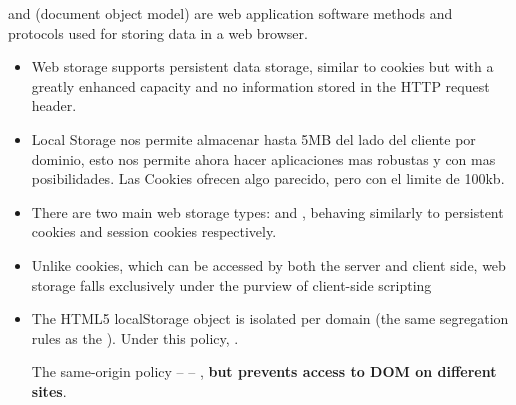 
 and  
(document object model) are web application
software methods and protocols used for storing data in a web browser. 

\begin{itemize}
\item
Web storage supports persistent data storage, similar to cookies but with
a greatly enhanced capacity and no information stored in the HTTP
request header.

\item
Local Storage nos permite almacenar hasta 5MB del lado del cliente
por dominio, esto nos permite ahora hacer aplicaciones mas robustas y
con mas posibilidades. Las Cookies ofrecen algo
parecido, pero con el limite de 100kb.

\item
There are two main web storage types: 
and , behaving similarly to persistent cookies and session
cookies respectively.
\item
Unlike cookies, which can be accessed by both the server and client side, web storage falls exclusively under the purview of client-side scripting
\item
The HTML5 localStorage object is isolated per domain (the same segregation rules as the ).
Under this policy, . 

The same-origin policy  –  – , {\bf but prevents access to
DOM on different sites}.
\end{itemize}

